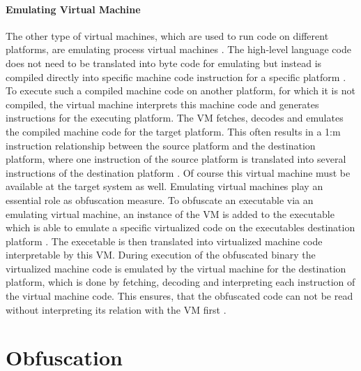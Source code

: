 \documentclass[10pt,twoside,a4paper,bibliography=totoc]{scrbook}
\begin{document}
\paragraph*{Emulating Virtual Machine}
The other type of virtual machines, which are used to run code on different platforms, are emulating process virtual machines \cite{virtbo}.
The high-level language code does not need to be translated into byte code for emulating but instead is compiled directly into specific machine code instruction for a specific platform \cite{craig2006virtual, virtbo}.
To execute such a compiled machine code on another platform, for which it is not compiled, the virtual machine interprets this machine code and generates instructions for the executing platform. 
The VM fetches, decodes and emulates the compiled machine code for the target platform.
This often results in a 1:m instruction relationship between the source platform and the destination platform, where one instruction of the source platform is translated into several instructions of the destination platform \cite{virtbo}. Of course this virtual machine must be available at the target system as well.
Emulating virtual machines play an essential role as obfuscation measure. 
To obfuscate an executable via an emulating virtual machine, an instance of the VM is added to the executable  which is able to emulate a specific virtualized code on the executables destination platform \cite{symantec_clampi}.
The execetable is then translated into virtualized machine code interpretable by this VM. 
During execution of the obfuscated binary the virtualized machine code is emulated by the virtual machine for the destination platform, which is done by fetching, decoding and interpreting each instruction of the virtual machine code.
This ensures, that the obfuscated code can not be read without interpreting its relation with the VM first \cite{symantec_clampi}.

\section{Obfuscation}
\label{sec2:obfus}
\end{document}

